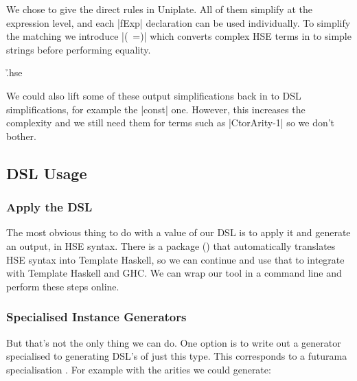 \documentclass[preprint,draft]{sigplanconf}
\begin{document}
We chose to give the direct rules in Uniplate. All of them simplify at the expression level, and each |fExp| declaration can be used individually. To simplify the matching we introduce |(~=)| which converts complex HSE terms in to simple strings before performing equality.

\h{.hse}

We could also lift some of these output simplifications back in to DSL simplifications, for example the |const| one. However, this increases the complexity and we still need them for terms such as |CtorArity-1| so we don't bother.

\subsection{DSL Usage}

\subsubsection{Apply the DSL}

The most obvious thing to do with a value of our DSL is to apply it and generate an output, in HSE syntax. There is a package () that automatically translates HSE syntax into Template Haskell, so we can continue and use that to integrate with Template Haskell and GHC. We can wrap our tool in a command line and perform these steps online.

\subsubsection{Specialised Instance Generators}

But that's not the only thing we can do. One option is to write out a generator specialised to generating DSL's of just this type. This corresponds to a futurama specialisation \cite{futanama:projections}. For example with the arities we could generate:
\end{document}
